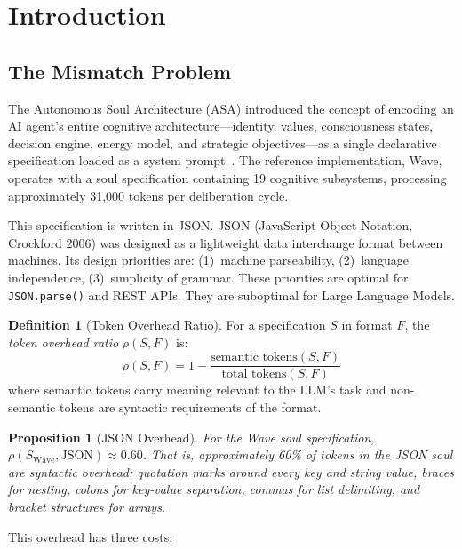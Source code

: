 \documentclass[12pt,a4paper]{article}
\theoremstyle{plain}
\newtheorem{proposition}[theorem]{Proposition}
\theoremstyle{definition}
\newtheorem{definition}[theorem]{Definition}
\theoremstyle{remark}
\begin{document}
\tableofcontents
\newpage

\section{Introduction}

\subsection{The Mismatch Problem}

The Autonomous Soul Architecture (ASA) introduced the concept of encoding an AI agent's entire cognitive architecture---identity, values, consciousness states, decision engine, energy model, and strategic objectives---as a single declarative specification loaded as a system prompt~\cite{galmanus2026a}. The reference implementation, Wave, operates with a soul specification containing 19 cognitive subsystems, processing approximately 31,000 tokens per deliberation cycle.

This specification is written in JSON. JSON (JavaScript Object Notation, Crockford 2006) was designed as a lightweight data interchange format between machines. Its design priorities are: (1)~machine parseability, (2)~language independence, (3)~simplicity of grammar. These priorities are optimal for \texttt{JSON.parse()} and REST APIs. They are suboptimal for Large Language Models.

\begin{definition}[Token Overhead Ratio]
For a specification $S$ in format $F$, the \emph{token overhead ratio} $\rho(S, F)$ is:
\[
\rho(S, F) = 1 - \frac{\text{semantic tokens}(S, F)}{\text{total tokens}(S, F)}
\]
where semantic tokens carry meaning relevant to the LLM's task and non-semantic tokens are syntactic requirements of the format.
\end{definition}

\begin{proposition}[JSON Overhead]
For the Wave soul specification, $\rho(S_{\text{Wave}}, \text{JSON}) \approx 0.60$. That is, approximately 60\% of tokens in the JSON soul are syntactic overhead: quotation marks around every key and string value, braces for nesting, colons for key-value separation, commas for list delimiting, and bracket structures for arrays.
\end{proposition}

This overhead has three costs:
\end{document}
